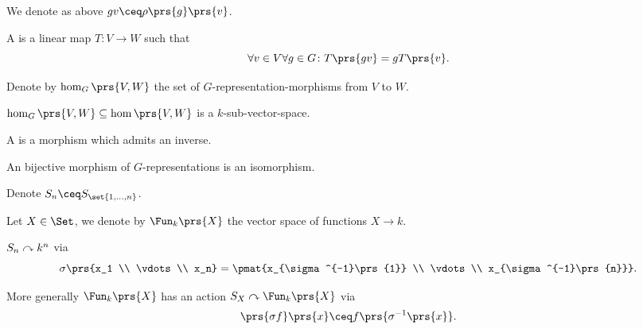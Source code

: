 \documentclass[10pt,a4paper,twoside,openany,hidelinks]{book}
\begin{document}
\begin{notation}
We denote as above $gv \ceq \rho\prs{g}\prs{v}$.
\end{notation}

\begin{definition}
A  is a linear map $T \colon V \to W$ such that
\[\forall v \in V \forall g \in G \colon T\prs{gv} = g T\prs{v} \text{.}\]
\end{definition}

\begin{notation}
Denote by $\hom_G\prs{V,W}$ the set of $G$-representation-morphisms from $V$ to $W$.
\end{notation}

\begin{remark}
$\hom_G\prs{V,W} \subseteq \hom\prs{V,W}$ is a $k$-sub-vector-space.
\end{remark}

\begin{definition}
A  is a morphism which admits an inverse.
\end{definition}

\begin{exercise}
An bijective morphism of $G$-representations is an isomorphism.
\end{exercise}

\begin{notation}
Denote $S_n \ceq S_{\set{1, \ldots, n}}$.
\end{notation}

\begin{notation}
Let $X \in \Set$, we denote by $\Fun_k\prs{X}$ the vector space of functions $X \to k$.
\end{notation}

\begin{example}
$S_n \curvearrowright k^n$ via
\[\sigma\prs{x_1 \\ \vdots \\ x_n} = \pmat{x_{\sigma^{-1}\prs{1}} \\ \vdots \\ x_{\sigma^{-1}\prs{n}}} \text{.}\]

More generally
$\Fun_k\prs{X}$ has an action $S_X \acts \Fun_k\prs{X}$ via
\[\prs{\sigma f}\prs{x} \ceq f\prs{\sigma^{-1}\prs{x}} \text{.}\]
\end{example}
\end{document}
